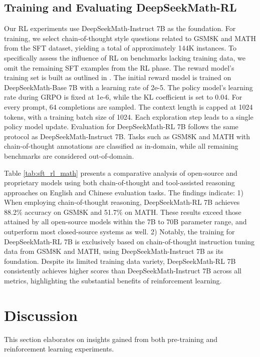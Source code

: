 \begin{itemize}[topsep=0pt]
\subsection{Training and Evaluating DeepSeekMath-RL}

Our RL experiments use DeepSeekMath-Instruct 7B as the foundation. For training, we select chain-of-thought style questions related to GSM8K and MATH from the SFT dataset, yielding a total of approximately 144K instances. To specifically assess the influence of RL on benchmarks lacking training data, we omit the remaining SFT examples from the RL phase. The reward model’s training set is built as outlined in \citep{wang2023math}. The initial reward model is trained on DeepSeekMath-Base 7B with a learning rate of 2e-5. The policy model's learning rate during GRPO is fixed at 1e-6, while the KL coefficient is set to 0.04. For every prompt, $64$ completions are sampled. The context length is capped at 1024 tokens, with a training batch size of 1024. Each exploration step leads to a single policy model update. Evaluation for DeepSeekMath-RL 7B follows the same protocol as DeepSeekMath-Instruct 7B. Tasks such as GSM8K and MATH with chain-of-thought annotations are classified as in-domain, while all remaining benchmarks are considered out-of-domain.

Table \ref{tab:sft_rl_math} presents a comparative analysis of open-source and proprietary models using both chain-of-thought and tool-assisted reasoning approaches on English and Chinese evaluation tasks. The findings indicate: 1) When employing chain-of-thought reasoning, DeepSeekMath-RL 7B achieves 88.2\% accuracy on GSM8K and 51.7\% on MATH. These results exceed those attained by all open-source models within the 7B to 70B parameter range, and outperform most closed-source systems as well. 2) Notably, the training for DeepSeekMath-RL 7B is exclusively based on chain-of-thought instruction tuning data from GSM8K and MATH, using DeepSeekMath-Instruct 7B as its foundation. Despite its limited training data variety, DeepSeekMath-RL 7B consistently achieves higher scores than DeepSeekMath-Instruct 7B across all metrics, highlighting the substantial benefits of reinforcement learning.

\section{Discussion}
This section elaborates on insights gained from both pre-training and reinforcement learning experiments.


\end{itemize}
